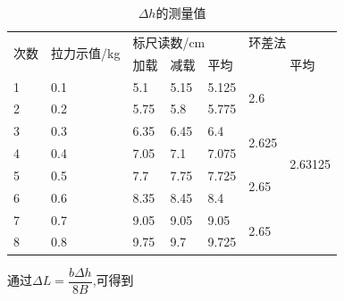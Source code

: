 \documentclass[UTF8]{article} %
\begin{document}
\begin{table}[h]
	
	\centering
	\begin{tabular}{|l|l|lll|ll|}
		\hline
		\multirow{2}{*}{次数} & \multirow{2}{*}{拉力示值/kg} & \multicolumn{3}{l|}{标尺读数/cm}                                  & \multicolumn{2}{l|}{环差法}                                               \\ \cline{3-7} 
		&                          & \multicolumn{1}{l|}{加载}   & \multicolumn{1}{l|}{减载}   & 平均    & \multicolumn{1}{l|}{}                       & 平均                       \\ \hline
		1                   & 0.1                       & \multicolumn{1}{l|}{5.1}  & \multicolumn{1}{l|}{5.15} & 5.125 & \multicolumn{1}{l|}{\multirow{2}{*}{2.6}}   & \multirow{8}{*}{2.63125} \\ \cline{1-5}
		2                   & 0.2                      & \multicolumn{1}{l|}{5.75} & \multicolumn{1}{l|}{5.8}  & 5.775 & \multicolumn{1}{l|}{}                       &                          \\ \cline{1-6}
		3                   & 0.3                        & \multicolumn{1}{l|}{6.35} & \multicolumn{1}{l|}{6.45} & 6.4   & \multicolumn{1}{l|}{\multirow{2}{*}{2.625}} &                          \\ \cline{1-5}
		4                   & 0.4                        & \multicolumn{1}{l|}{7.05} & \multicolumn{1}{l|}{7.1}  & 7.075 & \multicolumn{1}{l|}{}                       &                          \\ \cline{1-6}
		5                   & 0.5                        & \multicolumn{1}{l|}{7.7}  & \multicolumn{1}{l|}{7.75} & 7.725 & \multicolumn{1}{l|}{\multirow{2}{*}{2.65}}  &                          \\ \cline{1-5}
		6                   & 0.6                      & \multicolumn{1}{l|}{8.35} & \multicolumn{1}{l|}{8.45} & 8.4   & \multicolumn{1}{l|}{}                       &                          \\ \cline{1-6}
		7                   & 0.7                        & \multicolumn{1}{l|}{9.05} & \multicolumn{1}{l|}{9.05} & 9.05  & \multicolumn{1}{l|}{\multirow{2}{*}{2.65}}  &                          \\ \cline{1-5}
		8                   & 0.8                      & \multicolumn{1}{l|}{9.75} & \multicolumn{1}{l|}{9.7}  & 9.725 & \multicolumn{1}{l|}{}                       &     \\ \hline
	\end{tabular}
	\caption{$\Delta h$的测量值}
\end{table}\par 通过$\Delta L = \dfrac{b\Delta h}{8B}$,可得到
\end{document}
